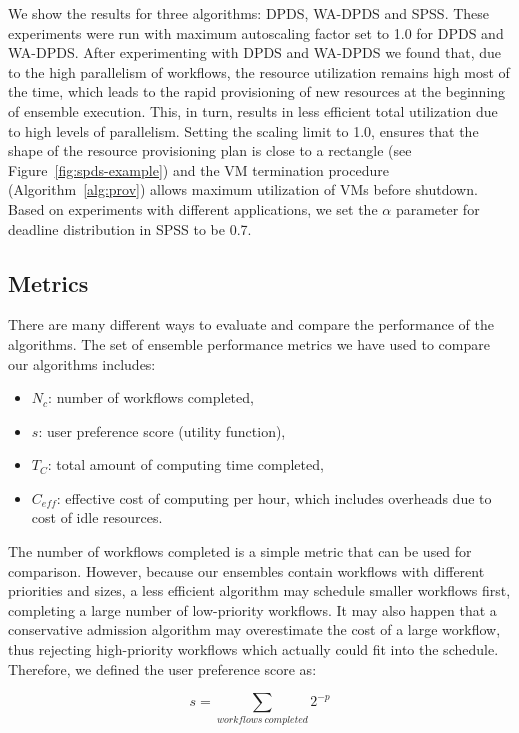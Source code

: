 \documentclass{sig-alternate}
\begin{document}
We show the results for three algorithms: DPDS, WA-DPDS and SPSS. These 
experiments were run with maximum autoscaling factor set to 1.0 for
DPDS and WA-DPDS. After experimenting with DPDS and WA-DPDS we found that, 
due to the high parallelism of workflows, the resource utilization remains 
high most of the time, which leads to the rapid provisioning of new resources 
at the beginning of ensemble execution. This, in turn, results in less 
efficient total utilization due to high levels of parallelism. Setting the 
scaling limit to 1.0, ensures that the shape of the resource provisioning 
plan  is close to a rectangle (see Figure~\ref{fig:spds-example}) and the VM 
termination procedure (Algorithm~\ref{alg:prov}) allows maximum utilization 
of VMs before shutdown. Based on experiments with different applications, 
we set the $\alpha$ parameter for deadline distribution in SPSS to be 0.7.


\subsection{Metrics}

There are many different ways to evaluate and compare the performance of 
the algorithms. The set of ensemble performance metrics we have used to
compare our algorithms includes:

\begin{itemize}
  \item $N_c$: number of workflows completed,
  \item $s$: user preference score (utility function),
  \item $T_C$: total amount of computing time completed,
  \item $C_{eff}$: effective cost of computing per hour, which includes
  overheads due to cost of idle resources.
\end{itemize}

The number of workflows completed is a simple metric that can be used for
comparison. However, because our ensembles contain workflows with different 
priorities and sizes, a less efficient algorithm may schedule smaller
workflows first, completing a large number of low-priority workflows. It may 
also happen that a conservative admission algorithm may overestimate the cost 
of a large workflow, thus rejecting high-priority workflows which actually 
could fit into the schedule. Therefore, we defined the user preference score as:

\begin{equation}
\label{eq:score}
s = \sum_{workflows\ completed}{2^{-p}}
\end{equation}
\end{document}
